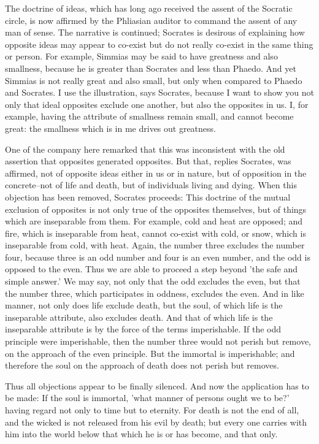 The doctrine of ideas, which has long ago received the assent of the
Socratic circle, is now affirmed by the Phliasian auditor to command
the assent of any man of sense. The narrative is continued; Socrates is
desirous of explaining how opposite ideas may appear to co-exist but do
not really co-exist in the same thing or person. For example, Simmias
may be said to have greatness and also smallness, because he is greater
than Socrates and less than Phaedo. And yet Simmias is not really great
and also small, but only when compared to Phaedo and Socrates. I use the
illustration, says Socrates, because I want to show you not only that
ideal opposites exclude one another, but also the opposites in us. I,
for example, having the attribute of smallness remain small, and cannot
become great: the smallness which is in me drives out greatness.

One of the company here remarked that this was inconsistent with the
old assertion that opposites generated opposites. But that, replies
Socrates, was affirmed, not of opposite ideas either in us or in
nature, but of opposition in the concrete--not of life and death, but
of individuals living and dying. When this objection has been removed,
Socrates proceeds: This doctrine of the mutual exclusion of opposites
is not only true of the opposites themselves, but of things which are
inseparable from them. For example, cold and heat are opposed; and fire,
which is inseparable from heat, cannot co-exist with cold, or snow,
which is inseparable from cold, with heat. Again, the number three
excludes the number four, because three is an odd number and four is
an even number, and the odd is opposed to the even. Thus we are able to
proceed a step beyond 'the safe and simple answer.' We may say, not
only that the odd excludes the even, but that the number three, which
participates in oddness, excludes the even. And in like manner, not only
does life exclude death, but the soul, of which life is the inseparable
attribute, also excludes death. And that of which life is the
inseparable attribute is by the force of the terms imperishable. If the
odd principle were imperishable, then the number three would not perish
but remove, on the approach of the even principle. But the immortal is
imperishable; and therefore the soul on the approach of death does not
perish but removes.

Thus all objections appear to be finally silenced. And now the
application has to be made: If the soul is immortal, 'what manner of
persons ought we to be?' having regard not only to time but to eternity.
For death is not the end of all, and the wicked is not released from his
evil by death; but every one carries with him into the world below that
which he is or has become, and that only.

